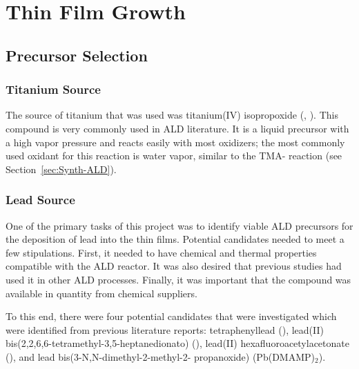 \chapter{Thin Film Growth}
\label{ch:SampFab}
\thispagestyle{empty}



\section{Precursor Selection}
\label{sec:SampFab-Precursors}

\lipsum

\subsection{Titanium Source}

The source of titanium that was used was titanium(IV) isopropoxide (\TiOiPr{}, ). This compound is very commonly used in ALD literature.\cite{cianci_atomic_2012,tallarida_growth_2011,lehnert_plasma_2012,cleveland_role_2012,kubrin_stacking_2012,lee_emph-situ_2012} It is a liquid precursor with a high vapor pressure and reacts easily with most oxidizers; the most commonly used oxidant for this reaction is water vapor, similar to the TMA- reaction (see Section~\vref{sec:Synth-ALD}). 

\subsection{Lead Source}

One of the primary tasks of this project was to identify viable ALD precursors for the deposition of lead into the thin films. Potential candidates needed to meet a few stipulations. First, it needed to have chemical and thermal properties compatible with the ALD reactor. It was also desired that previous studies had used it in other ALD processes. Finally, it was important that the compound was available in quantity from chemical suppliers. 

To this end, there were four potential candidates that were investigated which were identified from previous literature reports: tetraphenyllead ()\cite{harjuoja_2006}, lead(II) bis(2,2,6,6-tetramethyl-3,5-heptanedionato) ()\cite{watanabe_growth_2007}, lead(II) hexafluoroacetylacetonate ()\cite{Igumenov_1998}, and lead bis(3-N,N-dimethyl-2-methyl-2- propanoxide) (Pb(DMAMP)$_{2}$).\cite{Hwang_2007}


